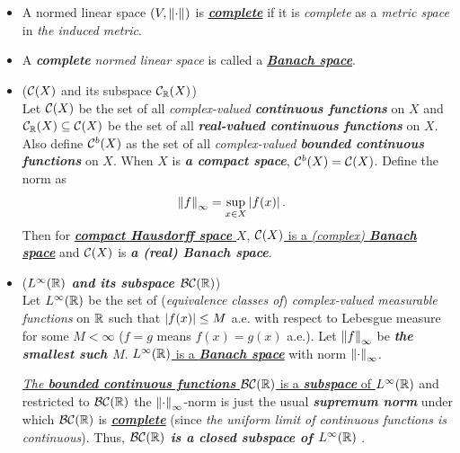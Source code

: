 \documentclass[11pt]{article}
\begin{document}
\begin{itemize}
\item \begin{definition}
A normed linear space $(V, \left\|\cdot\right\|_{})$  is \underline{\emph{\textbf{complete}}} if it is \emph{complete} as a \emph{metric space} in \emph{the induced metric}.
\end{definition}

\item \begin{definition}
A \emph{\textbf{complete}} \emph{normed linear space} is called a \underline{\emph{\textbf{Banach space}}}.
\end{definition}

\item \begin{example} (${\mathcal C}(X)$ and its subspace ${\mathcal C}_{{\mathbb R}}(X)$)\\
Let ${\mathcal C}(X)$ be the set of all \emph{complex-valued \textbf{continuous functions}} on $X$ and ${\mathcal C}_{{\mathbb R}}(X) \subseteq {\mathcal C}(X)$ be the set of all \emph{\textbf{real-valued continuous functions}} on $X$. Also define ${\mathcal C}^{b}(X)$ as the set of all \emph{complex-valued \textbf{bounded continuous functions}} on $X$. When $X$ is \emph{\textbf{a compact space}}, ${\mathcal C}^{b}(X) = {\mathcal C}(X)$.  Define the norm as 
\begin{align*}
\left\|f\right\|_{\infty} &= \sup_{x\in X}\left\lvert f(x) \right\rvert.
\end{align*} Then for \underline{\emph{\textbf{compact Hausdorff space}} $X$}, \underline{${\mathcal C}(X)$ is a \emph{(complex) \textbf{Banach space}}} and ${\mathcal C}(X)$ is \emph{\textbf{a (real) Banach space}}.
\end{example}


\item \begin{example} (\emph{\textbf{$L^{\infty}({\mathbb R})$ and its subspace ${\mathcal B}{\mathcal C}({\mathbb R})$}})\\
Let $L^{\infty}({\mathbb R})$ be the set of (\emph{equivalence classes of}) \emph{complex-valued measurable functions} on ${\mathbb R}$ such that $\left\lvert f(x) \right\rvert\le M$ a.e. with respect to Lebesgue measure for some $M < \infty$ ($f = g$ means $f(x) = g(x)$ a.e.). Let $\left\|f\right\|_{\infty}$ be \emph{\textbf{the smallest such $M$}}. \underline{$L^{\infty}({\mathbb R})$ is a \emph{\textbf{Banach space}}} with norm $\left\|\cdot\right\|_{\infty}$. 

\underline{\emph{The \textbf{bounded continuous functions}} ${\mathcal B}{\mathcal C}({\mathbb R})$ is a \emph{\textbf{subspace}} of $L^{\infty}({\mathbb R})$}  and restricted to ${\mathcal B}{\mathcal C}({\mathbb R})$ the $\left\|\cdot\right\|_{\infty}$-norm is just the usual \emph{\textbf{supremum norm}} under which ${\mathcal B}{\mathcal C}({\mathbb R})$  is \underline{\emph{\textbf{complete}}} (since \emph{the uniform limit of continuous functions is continuous}). Thus, \emph{\textbf{${\mathcal B}{\mathcal C}({\mathbb R})$ is a closed subspace of $L^{\infty}({\mathbb R})$ }}.


\end{example}
\end{itemize}
\end{document}
